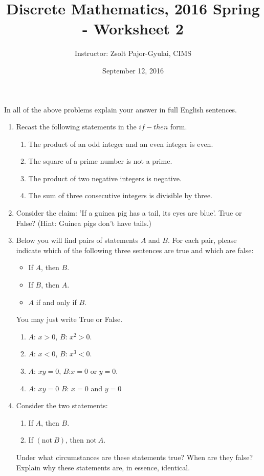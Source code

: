 \documentclass[11pt]{preprint}
\title{Discrete Mathematics, 2016 Spring - Worksheet 2}
\author{Instructor: Zsolt Pajor-Gyulai, CIMS}
\date{September 12, 2016}
\begin{document}
\maketitle

In all of the above problems explain your answer in full English sentences.

\begin{enumerate}
\item Recast the following statements in the $if-then$ form.
\begin{enumerate}
\item The product of an odd integer and an even integer is even.
\item The square of a prime number is not a prime.
\item The product of two negative integers is negative.
\item The sum of three consecutive integers is divisible by three.
\end{enumerate}


\item Consider the claim: 'If a guinea pig has a tail, its eyes are blue'. True or False? (Hint: Guinea pigs don't have tails.)

\item  Below you will find pairs of statements $A$ and $B$. For each pair, please indicate which of the following three sentences are true and which are false:
\begin{itemize}
\item If $A$, then $B$.
\item If $B$, then $A$.
\item $A$ if and only if $B$.
\end{itemize}
You may just write True or False.
\begin{enumerate}
\item $A$: $x>0$,  $B$: $x^2>0$.
\item $A$: $x<0$,  $B$: $x^3<0$.
\item $A$: $xy=0$, $B$:$x=0$ or $y=0$.
\item $A$: $xy=0$  $B$: $x=0$ and $y=0$
\end{enumerate}

\item Consider the two statements:
\begin{enumerate}
\item If $A$, then $B$.
\item If $(\textrm{not}~B)$, then $\textrm{not}~A$.
\end{enumerate}
Under what circumstances are these statements true? When are they false? Explain why these statements are, in essence, identical.
\newpage




\end{enumerate}
\end{document}
